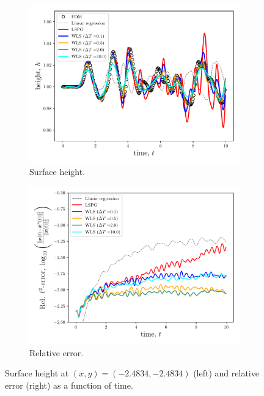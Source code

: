 \begin{figure}
\begin{center}
\begin{subfigure}[t]{0.49\textwidth}
\includegraphics[trim={0cm 0cm 0cm 0cm},clip,width=1.0\linewidth]{figs/swe/swe_h_vs_t_K83.pdf}
\caption{Surface height.}
\label{fig:rom_sols_swe1h}
\end{subfigure}
\begin{subfigure}[t]{0.49\textwidth}
\includegraphics[trim={0cm 0cm 0cm 0cm},clip,width=1.0\linewidth]{figs/swe/swe_error_vs_t_K83.pdf}
\caption{Relative error.}
\label{fig:rom_sols_swe1e}
\end{subfigure}
\caption{Surface height at $(x,y) = (-2.4834,-2.4834)$ (left) and relative error (right) as a function of time.} 
\label{fig:rom_sols_swe1}
\end{center}
\end{figure}

